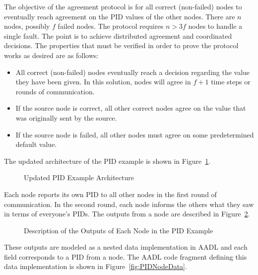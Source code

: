 The objective of the agreement protocol is for all correct (non-failed) nodes to eventually reach agreement on the PID values of the other nodes. There are $n$ nodes, possibly $f$ failed nodes. The protocol requires $n > 3f$ nodes to handle a single fault. The point is to achieve distributed agreement and coordinated decisions.
The properties that must be verified in order to prove the protocol works as desired are as follows: 
\begin{itemize}
	\item All correct (non-failed) nodes eventually reach a decision regarding the value they have been given.  In this solution, nodes will agree in $f+1$ time steps or rounds of communication.   
	\item If the source node is correct, all other correct nodes agree on the value that was originally sent by the source.  
	\item If the source node is failed, all other nodes must agree on some predetermined default value.  
\end{itemize}

The updated architecture of the PID example is shown in Figure~\ref{fig:PIDArch}. 
\begin{figure}[!htb]
        \caption{\label{fig:PIDArch} Updated PID Example Architecture}
\end{figure}

Each node reports its own PID to all other nodes in the first round of communication. In the second round, each node informs the others what they saw in terms of %
everyone's PIDs. %
The outputs from a node are described in Figure~\ref{fig:NodeOutputsPID}. %
\begin{figure}[!htb]
        \caption{\label{fig:NodeOutputsPID} Description of the Outputs of Each Node in the PID Example}
\end{figure}
These outputs are modeled as a nested data implementation in AADL and each field corresponds to a PID from a node. The AADL code fragment defining this data implementation is shown in Figure~\ref{fig:PIDNodeData}.

